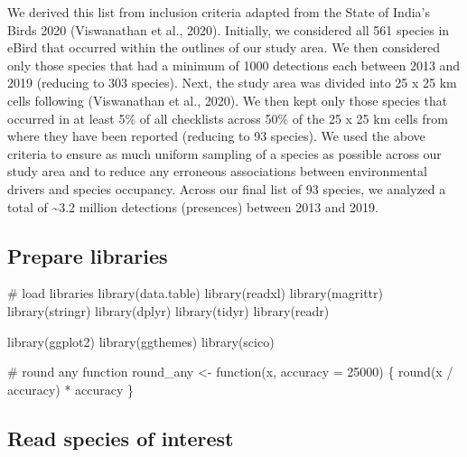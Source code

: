 \documentclass[]{article}
\newenvironment{Shaded}{}{}
\newcommand{\CommentTok}[1]{\textcolor[rgb]{0.00,0.50,0.00}{#1}}
\newcommand{\ControlFlowTok}[1]{\textcolor[rgb]{0.00,0.00,1.00}{#1}}
\newcommand{\DataTypeTok}[1]{#1}
\newcommand{\DecValTok}[1]{#1}
\newcommand{\KeywordTok}[1]{\textcolor[rgb]{0.00,0.00,1.00}{#1}}
\newcommand{\NormalTok}[1]{#1}
\newcommand{\OperatorTok}[1]{#1}
\newcommand{\StringTok}[1]{\textcolor[rgb]{0.00,0.50,0.50}{#1}}
\begin{document}
We derived this list from inclusion criteria adapted from the State of India's Birds 2020 (Viswanathan et al., 2020). Initially, we considered all 561 species in eBird that occurred within the outlines of our study area. We then considered only those species that had a minimum of 1000 detections each between 2013 and 2019 (reducing to 303 species). Next, the study area was divided into 25 x 25 km cells following (Viswanathan et al., 2020). We then kept only those species that occurred in at least 5\% of all checklists across 50\% of the 25 x 25 km cells from where they have been reported (reducing to 93 species). We used the above criteria to ensure as much uniform sampling of a species as possible across our study area and to reduce any erroneous associations between environmental drivers and species occupancy. Across our final list of 93 species, we analyzed a total of \textasciitilde{}3.2 million detections (presences) between 2013 and 2019.

\hypertarget{prepare-libraries}{%
\subsection{Prepare libraries}\label{prepare-libraries}}

\begin{Shaded}
\begin{Highlighting}[numbers=left,,]
\CommentTok{# load libraries}
\KeywordTok{library}\NormalTok{(data.table)}
\KeywordTok{library}\NormalTok{(readxl)}
\KeywordTok{library}\NormalTok{(magrittr)}
\KeywordTok{library}\NormalTok{(stringr)}
\KeywordTok{library}\NormalTok{(dplyr)}
\KeywordTok{library}\NormalTok{(tidyr)}
\KeywordTok{library}\NormalTok{(readr)}

\KeywordTok{library}\NormalTok{(ggplot2)}
\KeywordTok{library}\NormalTok{(ggthemes)}
\KeywordTok{library}\NormalTok{(scico)}

\CommentTok{# round any function}
\NormalTok{round_any <-}\StringTok{ }\ControlFlowTok{function}\NormalTok{(x, }\DataTypeTok{accuracy =} \DecValTok{25000}\NormalTok{) \{}
  \KeywordTok{round}\NormalTok{(x }\OperatorTok{/}\StringTok{ }\NormalTok{accuracy) }\OperatorTok{*}\StringTok{ }\NormalTok{accuracy}
\NormalTok{\}}
\end{Highlighting}
\end{Shaded}

\hypertarget{read-species-of-interest}{%
\subsection{Read species of interest}\label{read-species-of-interest}}
\end{document}
